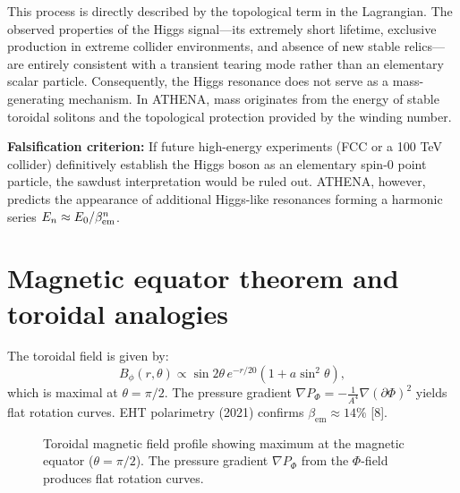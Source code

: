 \documentclass[11pt,a4paper]{article}
\begin{document}
This process is directly described by the topological term in the Lagrangian. The observed properties of the Higgs signal---its extremely short lifetime, exclusive production in extreme collider environments, and absence of new stable relics---are entirely consistent with a transient tearing mode rather than an elementary scalar particle. Consequently, the Higgs resonance does not serve as a mass-generating mechanism. In ATHENA, mass originates from the energy of stable toroidal solitons and the topological protection provided by the winding number.

\textbf{Falsification criterion:} If future high-energy experiments (FCC or a 100 TeV collider) definitively establish the Higgs boson as an elementary spin-0 point particle, the sawdust interpretation would be ruled out. ATHENA, however, predicts the appearance of additional Higgs-like resonances forming a harmonic series \( E_n \approx E_0 / \beta_{\rm em}^n \).

\section{Magnetic equator theorem and toroidal analogies}
\label{sec:magnetic}
The toroidal field is given by:
\[
B_\phi(r,\theta) \propto \sin 2\theta \, e^{-r/20} (1 + a \sin^2\theta),
\]
which is maximal at \(\theta = \pi/2\). The pressure gradient \(\nabla P_\Phi = -\frac{1}{A^4} \nabla (\partial \Phi)^2\) yields flat rotation curves. EHT polarimetry (2021) confirms \(\beta_{\mathrm{em}} \approx 14\%\) [8].

\begin{figure}[h]
\centering
{}
\caption{Toroidal magnetic field profile showing maximum at the magnetic equator (\(\theta = \pi/2\)). The pressure gradient \(\nabla P_\Phi\) from the \(\Phi\)-field produces flat rotation curves.}
\label{fig:toroidal}
\end{figure}
\end{document}

